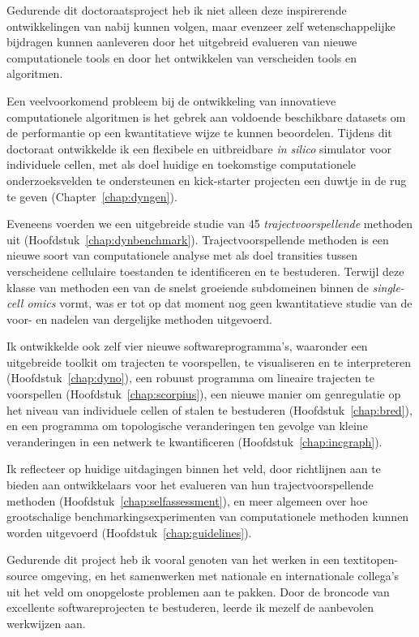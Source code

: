 Gedurende dit doctoraatsproject heb ik niet alleen deze inspirerende ontwikkelingen van nabij kunnen volgen, maar evenzeer zelf wetenschappelijke bijdragen kunnen aanleveren door het uitgebreid evalueren van nieuwe computationele tools en door het ontwikkelen van verscheiden tools en algoritmen.

Een veelvoorkomend probleem bij de ontwikkeling van innovatieve computationele algoritmen is het gebrek aan voldoende beschikbare datasets om de performantie op een kwantitatieve wijze te kunnen beoordelen. Tijdens dit doctoraat ontwikkelde ik een flexibele en uitbreidbare \textit{in silico} simulator voor individuele cellen, met als doel huidige en toekomstige computationele onderzoeksvelden te ondersteunen en kick-starter projecten een duwtje in de rug te geven (Chapter~\ref{chap:dyngen}). 

Eveneens voerden we een uitgebreide studie van 45 \textit{trajectvoorspellende} methoden uit (Hoofdstuk~\ref{chap:dynbenchmark}). Trajectvoorspellende methoden is een nieuwe soort van computationele analyse met als doel transities tussen verscheidene cellulaire toestanden te identificeren en te bestuderen. Terwijl deze klasse van methoden een van de snelst groeiende subdomeinen binnen de \textit{single-cell omics} vormt, was er tot op dat moment nog geen kwantitatieve studie van de voor- en nadelen van dergelijke methoden uitgevoerd.

Ik ontwikkelde ook zelf vier nieuwe softwareprogramma's, waaronder een uitgebreide toolkit om trajecten te voorspellen, te visualiseren en te interpreteren (Hoofdstuk~\ref{chap:dyno}), een robuust programma om lineaire trajecten te voorspellen (Hoofdstuk~\ref{chap:scorpius}), een nieuwe manier om genregulatie op het niveau van individuele cellen of stalen te bestuderen (Hoofdstuk~\ref{chap:bred}), en een programma om topologische veranderingen ten gevolge van kleine veranderingen in een netwerk te kwantificeren (Hoofdstuk~\ref{chap:incgraph}). 

Ik reflecteer op huidige uitdagingen binnen het veld, door richtlijnen aan te bieden aan ontwikkelaars voor het evalueren van hun trajectvoorspellende methoden (Hoofdstuk~\ref{chap:selfassessment}), en meer algemeen over hoe grootschalige benchmarkingsexperimenten van computationele methoden kunnen worden uitgevoerd (Hoofdstuk~\ref{chap:guidelines}).

Gedurende dit project heb ik vooral genoten van het werken in een textit{open-source} omgeving, en het samenwerken met nationale en internationale collega’s uit het veld om onopgeloste problemen aan te pakken.  Door de broncode van excellente softwareprojecten te bestuderen, leerde ik mezelf de aanbevolen werkwijzen aan.